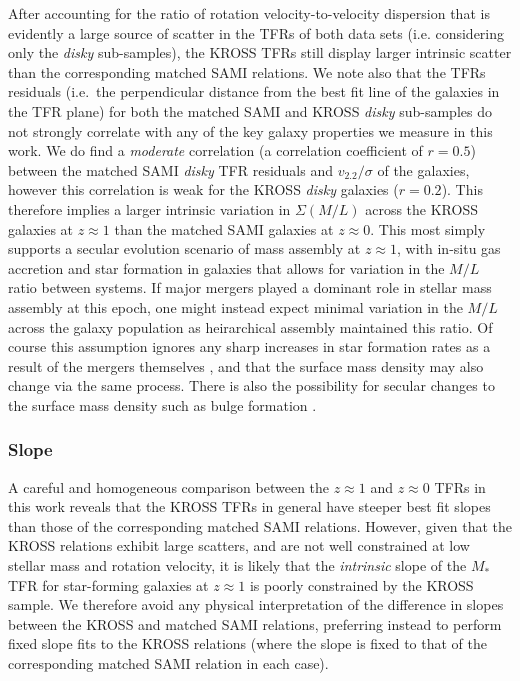 \documentclass[a4paper,fleqn,usenatbib]{mnras}
\begin{document}
{After accounting for the ratio of rotation velocity-to-velocity dispersion that is evidently a large source of scatter in the TFRs of both data sets (i.e. considering only the \textit{disky} sub-samples), the KROSS TFRs still display larger intrinsic scatter than the corresponding matched SAMI relations. We note also that the TFRs residuals (i.e.\ the perpendicular distance from the best fit line of the galaxies in the TFR plane) for both the matched SAMI and KROSS \textit{disky} sub-samples do not strongly correlate with any of the key galaxy properties we measure in this work. We do find a {\it moderate} correlation (a correlation coefficient of $r=0.5$) between the matched SAMI \textit{disky} TFR residuals and $v_{2.2}/\sigma$ of the galaxies, however this correlation is weak for the KROSS \textit{disky} galaxies ($r=0.2$). This therefore implies a larger intrinsic variation in $\Sigma(M/L)$ across the KROSS galaxies at $z\approx1$ than the matched SAMI galaxies at $z\approx0$. This most simply supports a secular evolution scenario of mass assembly at $z\approx1$, with in-situ gas accretion \citep[and perhaps minor mergers, e.g.][]{McLure:2013} and star formation in galaxies that allows for variation in the $M/L$ ratio between systems. If major mergers played a dominant role in stellar mass assembly at this epoch, one might instead expect minimal variation in the $M/L$ across the galaxy population as heirarchical assembly maintained this ratio. Of course this assumption ignores any sharp increases in star formation rates as a result of the mergers themselves \citep[e.g.][]{Joseph:1984,Hernquist:1989,Barnes:1991,Teyssier:2010}, and that the surface mass density may also change via the same process. There is also the possibility for secular changes to the surface mass density such as bulge formation \citep[e.g.][]{Kormendy:2004}.

\subsubsection{Slope}

A careful and homogeneous comparison between the $z\approx1$ and $z\approx0$ TFRs in this work reveals that the KROSS TFRs in general have steeper best fit slopes than those of the corresponding matched SAMI relations. However, given that the KROSS relations exhibit large scatters, and are not well constrained at low stellar mass and rotation velocity, it is likely that the {\it intrinsic} slope of the $M_{*}$ TFR for star-forming galaxies at $z\approx1$ is poorly constrained by the KROSS sample. We therefore avoid any physical interpretation of the difference in slopes between the KROSS and matched SAMI relations, preferring instead to perform fixed slope fits to the KROSS relations (where the slope is fixed to that of the corresponding matched SAMI relation in each case). 

}
\end{document}
